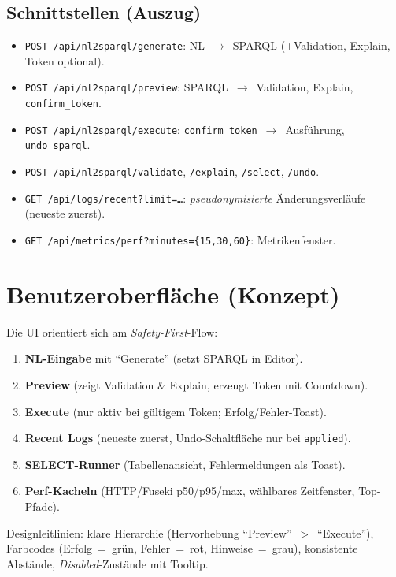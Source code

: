 \subsection{Schnittstellen (Auszug)}
\begin{itemize}
  \item \texttt{POST /api/nl2sparql/generate}: NL~$\rightarrow$~SPARQL (+Validation, Explain, Token optional).
  \item \texttt{POST /api/nl2sparql/preview}: SPARQL~$\rightarrow$~Validation, Explain, \texttt{confirm\_token}.
  \item \texttt{POST /api/nl2sparql/execute}: \texttt{confirm\_token}~$\rightarrow$~Ausführung, \texttt{undo\_sparql}.
  \item \texttt{POST /api/nl2sparql/validate}, \texttt{/explain}, \texttt{/select}, \texttt{/undo}.
  \item \texttt{GET /api/logs/recent?limit=\ldots}: \emph{pseudonymisierte} Änderungsverläufe (neueste zuerst).
  \item \texttt{GET /api/metrics/perf?minutes=\{15,30,60\}}: Metrikenfenster.
\end{itemize}

\section{Benutzeroberfläche (Konzept)}
Die UI orientiert sich am \emph{Safety-First}-Flow:
\begin{enumerate}
  \item \textbf{NL-Eingabe} mit \enquote{Generate} (setzt SPARQL in Editor).
  \item \textbf{Preview} (zeigt Validation \& Explain, erzeugt Token mit Countdown).
  \item \textbf{Execute} (nur aktiv bei gültigem Token; Erfolg/Fehler-Toast).
  \item \textbf{Recent Logs} (neueste zuerst, Undo-Schaltfläche nur bei \texttt{applied}).
  \item \textbf{SELECT-Runner} (Tabellenansicht, Fehlermeldungen als Toast).
  \item \textbf{Perf-Kacheln} (HTTP/Fuseki p50/p95/max, wählbares Zeitfenster, Top-Pfade).
\end{enumerate}
Designleitlinien: klare Hierarchie (Hervorhebung \enquote{Preview}~$>$~\enquote{Execute}), Farbcodes (Erfolg~=~grün, Fehler~=~rot, Hinweise~=~grau), konsistente Abstände, \emph{Disabled}-Zustände mit Tooltip.

